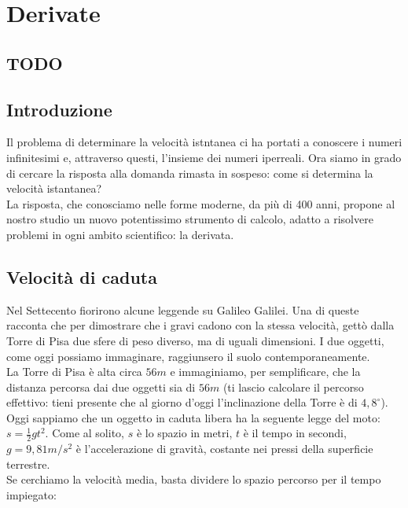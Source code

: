 


\chapter{Derivate}

\section{TODO}

\section{Introduzione}
\label{}

% 

Il problema di determinare la velocità istntanea ci ha portati a conoscere 
i numeri infinitesimi e, attraverso questi, l'insieme dei numeri iperreali.
Ora siamo in grado di cercare la risposta alla domanda rimasta in sospeso: 
come si determina la velocità istantanea?\\
La risposta, che conosciamo nelle forme moderne, da più di 400 anni,
propone al nostro studio un nuovo potentissimo strumento di calcolo, adatto a 
risolvere problemi in ogni ambito scientifico: la derivata.

\section{Velocità di caduta}
\label{04_diffvelcaduta}
Nel Settecento fiorirono alcune leggende su Galileo Galilei. Una di queste racconta 
che per dimostrare che i gravi cadono con la stessa velocità, gettò dalla Torre
di Pisa due sfere di peso diverso, ma di uguali dimensioni. I due oggetti, come
oggi possiamo immaginare, raggiunsero il suolo contemporaneamente.\\
La Torre di Pisa è alta circa $56m$ e immaginiamo, per semplificare, che la 
distanza percorsa dai due oggetti sia di $56m$ (ti lascio calcolare il 
percorso effettivo: tieni presente che al giorno d'oggi l'inclinazione della 
Torre è di $4,8^\circ$).\\
Oggi sappiamo che un oggetto in caduta libera ha la seguente legge del moto:
\(s=\frac{1}{2}gt^2\). Come al solito, $s$ è lo spazio in metri, $t$ è il 
tempo in secondi, $g=9,81 m/s^2$ è l'accelerazione di gravità, costante nei
pressi della superficie terrestre.\\
Se cerchiamo la velocità media, basta dividere lo spazio percorso per il tempo
impiegato:


